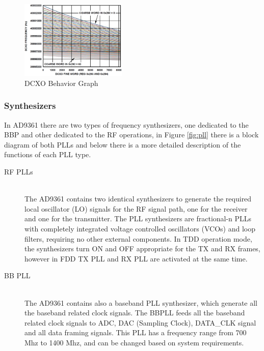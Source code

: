 \begin{figure}[htbp]
    \centering
    \includegraphics[width=0.45\textwidth]{./figures/dcxo_graph}
    \caption{ DCXO Behavior Graph
    \label{fig:dcxo}}
\end{figure}

\subsubsection{Synthesizers}

 In AD9361 there are two types of frequency synthesizers, one dedicated to the
BBP and other dedicated to the RF operations, in Figure \ref{fig:pll} there is
a block diagram of both PLLs and below there is a more detailed description of
the functions of each PLL type.

\begin{description}
	\item[RF PLLs] \hfill \\
	The AD9361 contains two identical synthesizers to generate the required local
  oscillator (LO) signals for the RF signal path, one for the receiver and one for
  the transmitter. The PLL synthesizers are fractional-n PLLs with completely
  integrated voltage controlled oscillators (VCOs) and loop filters, requiring no
  other external components. In TDD operation mode, the synthesizers turn ON and
  OFF appropriate for the TX and RX frames, however in FDD TX PLL and RX PLL are
  activated at the same time.

	\item[BB PLL] \hfill \\
  The AD9361 contains also a baseband PLL synthesizer,
	which generate all the baseband related clock signals. The BBPLL feeds all the
	baseband related clock signals to ADC, DAC (Sampling Clock), DATA\_CLK signal
	and all data framing signals. This PLL has a frequency range from 700 Mhz to
	1400 Mhz, and can be changed based on system requirements.

\end{description}

